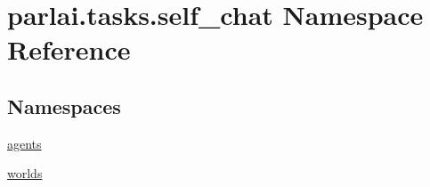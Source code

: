 \hypertarget{namespaceparlai_1_1tasks_1_1self__chat}{}\section{parlai.\+tasks.\+self\+\_\+chat Namespace Reference}
\label{namespaceparlai_1_1tasks_1_1self__chat}
\subsection*{Namespaces}
\begin{DoxyCompactItemize}
\item 
 \hyperlink{namespaceparlai_1_1tasks_1_1self__chat_1_1agents}{agents}
\item 
 \hyperlink{namespaceparlai_1_1tasks_1_1self__chat_1_1worlds}{worlds}
\end{DoxyCompactItemize}
